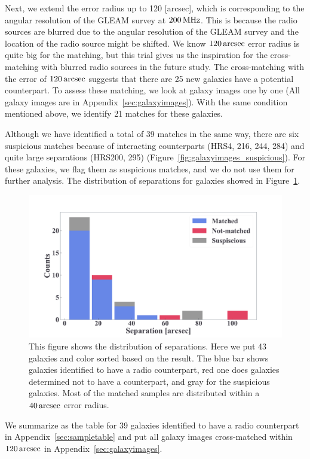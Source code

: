 Next, we extend the error radius up to 120 [arcsec], which is corresponding to the angular resolution of the GLEAM survey at $200\,\mathrm{MHz}$.
This is because the radio sources are blurred due to the angular resolution of the GLEAM survey and the location of the radio source might be shifted.
We know $120\,\mathrm{arcsec}$ error radius is quite big for the matching, but this trial gives us the inspiration for the cross-matching with blurred radio sources in the future study.
The cross-matching with the error of $120\,\mathrm{arcsec}$ suggests that there are 25 new galaxies have a potential counterpart.
To assess these matching, we look at galaxy images one by one (All galaxy images are in Appendix~\ref{sec:galaxyimages}).
With the same condition mentioned above, we identify 21 matches for these galaxies.

Although we have identified a total of 39 matches in the same way, there are six suspicious matches because of interacting counterparts (HRS4, 216, 244, 284) and quite large separations (HRS200, 295) (Figure~\ref{fig:galaxyimages_suspicious}).
For these galaxies, we flag them as suspicious matches, and we do not use them for further analysis.
The distribution of separations for galaxies showed in Figure~\ref{fig:separation}.

\begin{figure}[htbp]
	\centering
	\includegraphics[width=.6\linewidth]{Chapter_4/Figures/Method_separation.pdf}
    \caption[Separation from the cross-matching]{\label{fig:separation}
        This figure shows the distribution of separations.
        Here we put 43 galaxies and color sorted based on the result.
        The blue bar shows galaxies identified to have a radio counterpart, red one does galaxies determined not to have a counterpart, and gray for the suspicious galaxies.
        Most of the matched samples are distributed within a $40\,\mathrm{arcsec}$ error radius.
    }
\end{figure}

We summarize as the table for 39 galaxies identified to have a radio counterpart in Appendix~\ref{sec:sampletable} and put all galaxy images cross-matched within $120\,\mathrm{arcsec}$ in Appendix~\ref{sec:galaxyimages}.



